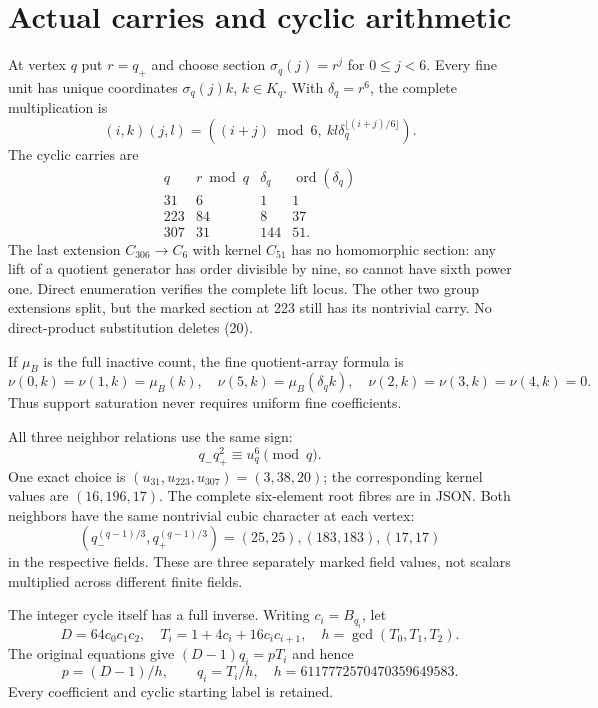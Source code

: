 \section{Actual carries and cyclic arithmetic}
At vertex $q$ put $r=q_+$ and choose section $\sigma_q(j)=r^j$ for $0\le j<6$.
Every fine unit has unique coordinates $\sigma_q(j)k$, $k\in K_q$.
With $\delta_q=r^6$, the complete multiplication is
\[
 (i,k)(j,l)=((i+j)\bmod6,\ kl\delta_q^{\lfloor(i+j)/6\rfloor}). \tag{20}
\]
The cyclic carries are
\[
\begin{array}{c|r|r|r}
q&r\bmod q&\delta_q&\operatorname{ord}(\delta_q)\\\hline
31&6&1&1\\
223&84&8&37\\
307&31&144&51.
\end{array}                                                  \tag{21}
\]
The last extension $C_{306}\to C_6$ with kernel $C_{51}$ has no homomorphic
section: any lift of a quotient generator has order divisible by nine, so cannot
have sixth power one. Direct enumeration verifies the complete lift locus.
The other two group extensions split, but the marked section at 223 still has
its nontrivial carry. No direct-product substitution deletes (20).

If $\mu_B$ is the full inactive count, the fine quotient-array formula is
\[
 \nu(0,k)=\nu(1,k)=\mu_B(k),\quad
 \nu(5,k)=\mu_B(\delta_q k),\quad
 \nu(2,k)=\nu(3,k)=\nu(4,k)=0.                            \tag{22}
\]
Thus support saturation never requires uniform fine coefficients.

All three neighbor relations use the same sign:
\[
 q_-q_+^2\equiv u_q^6\pmod q.                            \tag{23}
\]
One exact choice is $(u_{31},u_{223},u_{307})=(3,38,20)$; the corresponding
kernel values are $(16,196,17)$. The complete six-element root fibres are in
JSON. Both neighbors have the same nontrivial cubic character at each vertex:
\[
 (q_-^{(q-1)/3},q_+^{(q-1)/3})=(25,25),(183,183),(17,17)
\]
in the respective fields. These are three separately marked field values, not
scalars multiplied across different finite fields.

The integer cycle itself has a full inverse. Writing $c_i=B_{q_i}$, let
\[
 D=64c_0c_1c_2,
 \quad T_i=1+4c_i+16c_ic_{i+1},\quad h=\gcd(T_0,T_1,T_2).
\]
The original equations give $(D-1)q_i=pT_i$ and hence
\[
 p=(D-1)/h,\qquad q_i=T_i/h,
 \quad h=6117772570470359649583.                          \tag{24}
\]
Every coefficient and cyclic starting label is retained.

